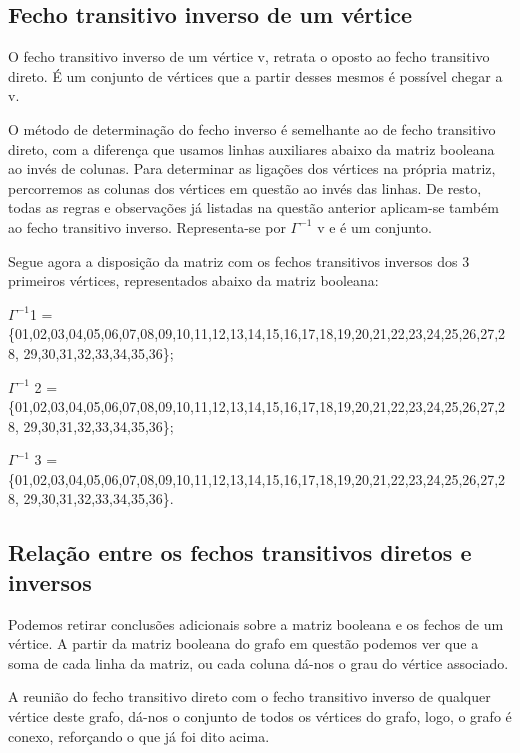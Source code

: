 \subsection{ Fecho transitivo inverso de um vértice }
O fecho transitivo inverso de um vértice v, retrata o oposto ao fecho transitivo direto. É um conjunto de 
vértices que a partir desses mesmos é possível chegar a v.\par
O método de determinação do fecho inverso é semelhante ao de fecho transitivo direto, com a diferença 
que usamos linhas auxiliares abaixo da matriz booleana ao invés de colunas. Para determinar as ligações dos 
vértices na própria matriz, percorremos as colunas dos vértices em questão ao invés das linhas. De resto, todas as 
regras e observações já listadas na questão anterior aplicam-se também ao fecho transitivo inverso. Representa-se por $\Gamma^{-1}$ v e é um conjunto.\par 
Segue agora a disposição da matriz com os fechos transitivos inversos dos 3 primeiros vértices, representados abaixo da matriz booleana:\par
$\Gamma^{-1}$1 =\\
\{01,02,03,04,05,06,07,08,09,10,11,12,13,14,15,16,17,18,19,20,21,22,23,24,25,26,27,28,
29,30,31,32,33,34,35,36\};\par
$\Gamma^{-1}$ 2 =\\
\{01,02,03,04,05,06,07,08,09,10,11,12,13,14,15,16,17,18,19,20,21,22,23,24,25,26,27,28,
29,30,31,32,33,34,35,36\};\par
$\Gamma^{-1}$ 3 =\\
\{01,02,03,04,05,06,07,08,09,10,11,12,13,14,15,16,17,18,19,20,21,22,23,24,25,26,27,28,
29,30,31,32,33,34,35,36\}.\par

\subsection{ Relação entre os fechos transitivos diretos e inversos }
Podemos retirar conclusões adicionais sobre a matriz booleana e os fechos de um vértice. A partir da 
matriz booleana do grafo em questão podemos ver que a soma de cada linha da matriz, ou cada coluna dá-nos o 
grau do vértice associado.\par
A reunião do fecho transitivo direto com o fecho transitivo inverso de qualquer vértice deste grafo, 
dá-nos o conjunto de todos os vértices do grafo, logo, o grafo é conexo, reforçando o que já foi dito acima.\par
